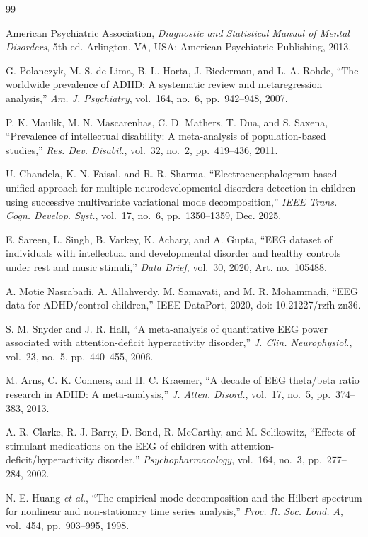 \begin{thebibliography}{99}

 American Psychiatric Association, \emph{Diagnostic and Statistical Manual of
Mental Disorders}, 5th ed. Arlington, VA, USA: American Psychiatric Publishing, 2013.

 G. Polanczyk, M. S. de Lima, B. L. Horta, J. Biederman, and L. A.
Rohde, ``The worldwide prevalence of ADHD: A systematic review and metaregression analysis,''
\emph{Am. J. Psychiatry}, vol.~164, no.~6, pp.~942--948, 2007.

 P. K. Maulik, M. N. Mascarenhas, C. D. Mathers, T. Dua, and S. Saxena,
``Prevalence of intellectual disability: A meta-analysis of population-based studies,''
\emph{Res. Dev. Disabil.}, vol.~32, no.~2, pp.~419--436, 2011.

 U. Chandela, K. N. Faisal, and R. R. Sharma, ``Electroencephalogram-based
unified approach for multiple neurodevelopmental disorders detection in children using
successive multivariate variational mode decomposition,'' \emph{IEEE Trans. Cogn. Develop.
Syst.}, vol.~17, no.~6, pp.~1350--1359, Dec. 2025.

 E. Sareen, L. Singh, B. Varkey, K. Achary, and A. Gupta, ``EEG
dataset of individuals with intellectual and developmental disorder and healthy controls
under rest and music stimuli,'' \emph{Data Brief}, vol.~30, 2020, Art. no.~105488.

 A. Motie Nasrabadi, A. Allahverdy, M. Samavati, and M. R. Mohammadi,
``EEG data for ADHD/control children,'' IEEE DataPort, 2020, doi: 10.21227/rzfh-zn36.

 S. M. Snyder and J. R. Hall, ``A meta-analysis of quantitative EEG power
associated with attention-deficit hyperactivity disorder,'' \emph{J. Clin. Neurophysiol.},
vol.~23, no.~5, pp.~440--455, 2006.

 M. Arns, C. K. Conners, and H. C. Kraemer, ``A decade of EEG theta/beta
ratio research in ADHD: A meta-analysis,'' \emph{J. Atten. Disord.}, vol.~17, no.~5,
pp.~374--383, 2013.

 A. R. Clarke, R. J. Barry, D. Bond, R. McCarthy, and M. Selikowitz,
``Effects of stimulant medications on the EEG of children with attention-deficit/hyperactivity
disorder,'' \emph{Psychopharmacology}, vol.~164, no.~3, pp.~277--284, 2002.

 N. E. Huang \emph{et al.}, ``The empirical mode decomposition and the
Hilbert spectrum for nonlinear and non-stationary time series analysis,'' \emph{Proc. R. Soc.
Lond. A}, vol.~454, pp.~903--995, 1998.


\end{thebibliography}
